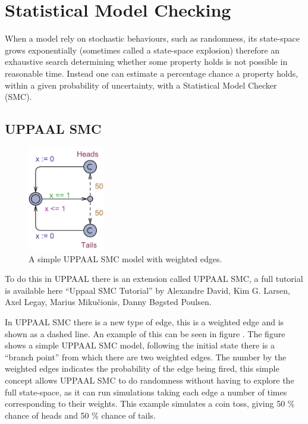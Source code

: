 \newpage
\section{Statistical Model Checking}
When a model rely on stochastic behaviours, such as randomness, its state-space grows exponentially (sometimes called a state-space explosion) therefore an exhaustive search determining whether some property holds is not possible in reasonable time. 
Instead one can estimate a percentage chance a property holds, within a given probability of uncertainty, with a Statistical Model Checker (SMC). 

\subsection{UPPAAL SMC}\label{subsec:uppaalsmc}
\begin{figure}
\centering
  \includegraphics[width=0.3\textwidth]{Figures/Model/Simple_SMC.pdf} 
\caption{A simple UPPAAL SMC model with weighted edges. }
\label{fig:simpleSMC}
\end{figure}

To do this in UPPAAL there is an extension called UPPAAL SMC, a full tutorial is available here ``Uppaal SMC Tutorial''\cite{DBLP:journals/sttt/DavidLLMP15} by Alexandre David, Kim G. Larsen, Axel Legay, Marius Miku\v{c}ionis, Danny B\o gsted Poulsen.

In UPPAAL SMC there is a new type of edge, this is a weighted edge and is shown as a dashed line. 
An example of this can be seen in figure . 
The figure shows a simple UPPAAL SMC model, following the initial state there is a ``branch point'' from which there are two weighted edges.
The number by the weighted edges indicates the probability of the edge being fired, this simple concept allows UPPAAL SMC to do randomness without having to explore the full state-space, as it can run simulations taking each edge a number of times corresponding to their weights. 
This example simulates a coin toss, giving 50 \% chance of heads and 50 \% chance of tails. 

